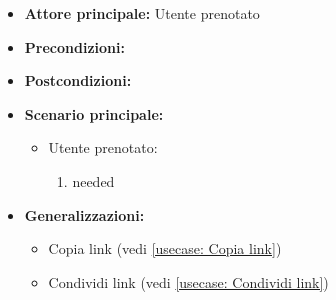 \label{usecase:Ordine collaborativo}
\begin{itemize}
\item \textbf{Attore principale:}  Utente prenotato
\item \textbf{Precondizioni:}
\item \textbf{Postcondizioni:}
\item \textbf{Scenario principale:}
\begin{itemize}
\item  Utente prenotato:
\begin{enumerate}
\item needed
\end{enumerate}
\end{itemize}
\item \textbf{Generalizzazioni:}
\begin{itemize}
\item  Copia link (vedi \autoref{usecase: Copia link})
\item  Condividi link (vedi \autoref{usecase: Condividi link})
\end{itemize}
\end{itemize}